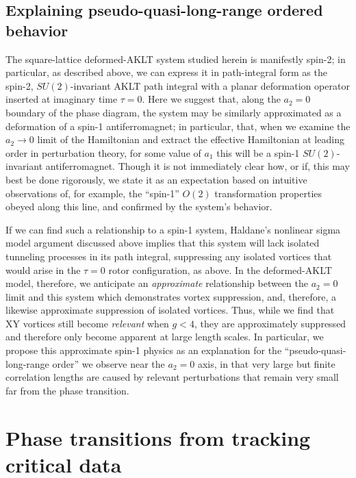 \documentclass[aps,prb,letterpaper,superscriptaddress,twocolumn,showpacs,floatfix,10pt]{revtex4-1}
\begin{document}
\subsection{Explaining pseudo-quasi-long-range ordered behavior}
\label{app:spin1}
The square-lattice deformed-AKLT system studied herein is manifestly spin-2;
in particular, as described above, we can express it
in path-integral form as the spin-2, $SU(2)$-invariant AKLT path integral
with a planar deformation operator inserted at imaginary time $\tau=0$. Here
we suggest that, along the $a_2=0$ boundary of the
phase diagram, the system may be similarly approximated
as a deformation of a spin-1 antiferromagnet; in particular, that, when we
examine the $a_2\to 0$ limit of the Hamiltonian and extract the effective
Hamiltonian at leading order in perturbation theory, for some value of $a_1$
this will be a spin-1 $SU(2)$-invariant antiferromagnet.
Though it is not immediately clear how, or if, this may best be done rigorously,
we state it as an expectation based on intuitive observations of,
for example, the ``spin-1'' $O(2)$ transformation properties obeyed along
this line, and confirmed by the system's behavior.

If we can find such a relationship to a spin-1 system, Haldane's nonlinear
sigma model argument discussed above implies that this system will lack
isolated tunneling processes in its path integral, suppressing any isolated
vortices that would arise in the $\tau=0$ rotor configuration, as above.
In the deformed-AKLT model, therefore, we anticipate an \textit{approximate}
relationship between the $a_2=0$ limit and this system which demonstrates
vortex suppression, and, therefore, a likewise approximate suppression of
isolated vortices. Thus, while we find that XY vortices still become
\textit{relevant} when $g<4$, they are approximately suppressed and therefore
only become apparent at large length scales. In particular, we propose this
approximate spin-1 physics as an explanation for the
``pseudo-quasi-long-range order'' we observe near the $a_2=0$ axis, in that
very large but finite correlation lengths are caused by relevant
perturbations that remain very small far from the phase transition.

\section{Phase transitions from tracking critical data}
\label{app:KT}
\end{document}
